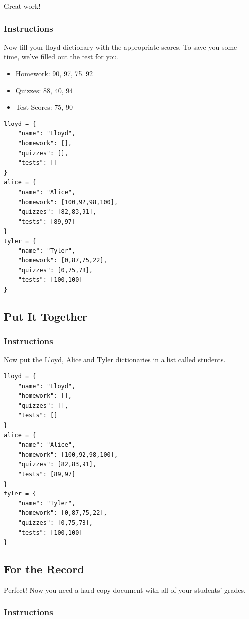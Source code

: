 \documentclass[12pt,a4paper,final,twoside,onecolumn,titlepage]{book}
\begin{document}
Great work!
\subsubsection{Instructions}

Now fill your lloyd dictionary with the appropriate scores. To save you some time, we've filled out the rest for you.
\begin{itemize}
\item Homework: 90, 97, 75, 92
\item Quizzes: 88, 40, 94
\item Test Scores: 75, 90
\end{itemize}

\begin{lstlisting}
lloyd = {
    "name": "Lloyd",
    "homework": [],
    "quizzes": [],
    "tests": []
}
alice = {
    "name": "Alice",
    "homework": [100,92,98,100],
    "quizzes": [82,83,91],
    "tests": [89,97]
}
tyler = {
    "name": "Tyler",
    "homework": [0,87,75,22],
    "quizzes": [0,75,78],
    "tests": [100,100]
}
\end{lstlisting}

\subsection{Put It Together}
\subsubsection{Instructions}
Now put the Lloyd, Alice and Tyler dictionaries in a list called students.
\begin{lstlisting}
lloyd = {
    "name": "Lloyd",
    "homework": [],
    "quizzes": [],
    "tests": []
}
alice = {
    "name": "Alice",
    "homework": [100,92,98,100],
    "quizzes": [82,83,91],
    "tests": [89,97]
}
tyler = {
    "name": "Tyler",
    "homework": [0,87,75,22],
    "quizzes": [0,75,78],
    "tests": [100,100]
}
\end{lstlisting}

\subsection{For the Record}

Perfect! Now you need a hard copy document with all of your students' grades.
\subsubsection{Instructions}
\end{document}
